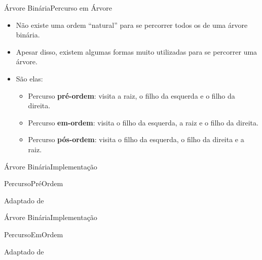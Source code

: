 \documentclass[aspectratio=169]{beamer}
\begin{document}
\begin{frame}{Árvore Binária}{Percurso em Árvore}
\begin{itemize}
 \item Não existe uma ordem ``natural'' para se percorrer todos os de uma árvore binária.
 \item Apesar disso, existem algumas formas muito utilizadas para se percorrer uma árvore. 
 \item São elas:
 \begin{itemize}
 \item Percurso {\bf pré-ordem}: visita a raiz, o filho da esquerda e o filho da direita.
 \item Percurso {\bf em-ordem}: visita o filho da esquerda, a raiz e o filho da direita.
 \item Percurso {\bf pós-ordem}: visita o filho da esquerda, o filho da direita e a raiz.
 \end{itemize} 
\end{itemize}
\end{frame}


\begin{frame}{Árvore Binária}{Implementação}
\begin{algorithm}[H]
\caption{PercursoPréOrdem} 
\label{PercursoPreOrdem}
\end{algorithm}
\tiny{Adaptado de \cite{Backes2016}}
\end{frame}


\begin{frame}{Árvore Binária}{Implementação}
\begin{algorithm}[H]
\caption{PercursoEmOrdem} 
\label{PercursoEmOrdem}
\end{algorithm}
\tiny{Adaptado de \cite{Backes2016}}
\end{frame}
\end{document}

